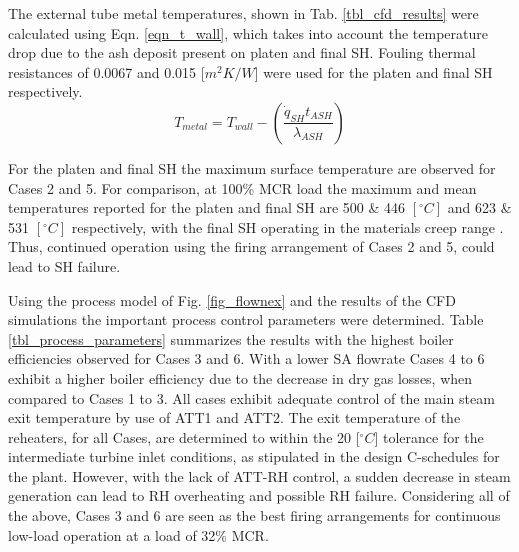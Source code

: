 \documentclass[twocolumn,10pt]{asme2ej}
\begin{document}
The external tube metal temperatures, shown in Tab. \ref{tbl_cfd_results} were calculated using Eqn. \ref{eqn_t_wall}, which takes into account the temperature drop due to the ash deposit present on platen and final SH. Fouling thermal resistances of 0.0067 and 0.015 [$m^2K/W$] were used for the platen and final SH respectively.
\begin{equation}\label{eqn_t_wall}
T_{metal} = T_{wall} - \left(\frac{\dot{q}_{SH}t_{ASH}}{\lambda_{ASH}}\right)
\end{equation}

For the platen and final SH the maximum surface temperature are observed for Cases 2 and 5. For comparison, at 100\% MCR load the maximum and mean temperatures reported for the platen and final SH are 500 \& 446 $[^\circ C]$ and 623 \& 531 $[^\circ C]$ respectively, with the final SH operating in the materials creep range \cite{Laubscher2019b}. Thus, continued operation using the firing arrangement of Cases 2 and 5, could lead to SH failure.

Using the process model of Fig. \ref{fig_flownex} and the results of the CFD simulations the important process control parameters were determined. Table \ref{tbl_process_parameters} summarizes the results with the highest boiler efficiencies observed for Cases 3 and 6. With a lower SA flowrate Cases 4 to 6 exhibit a higher boiler efficiency due to the decrease in dry gas losses, when compared to Cases 1 to 3. All cases exhibit adequate control of the main steam exit temperature by use of ATT1 and ATT2. The exit temperature of the reheaters, for all Cases, are determined to within the 20 [$^\circ C$] tolerance for the intermediate turbine inlet conditions, as stipulated in the design C-schedules for the plant. However, with the lack of ATT-RH control, a sudden decrease in steam generation can lead to RH overheating and possible RH failure. Considering all of the above, Cases 3 and 6 are seen as the best firing arrangements for continuous low-load operation at a load of 32\% MCR.
\end{document}
